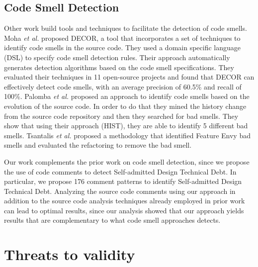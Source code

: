 \documentclass[conference]{IEEEtran}
\newcommand{\SADTD}{Self-admitted Design Technical Debt\xspace}
\begin{document}

\subsection{Code Smell Detection}

Other work build tools and techniques to facilitate the detection of code smells. Moha \textit{et al.} \cite{Moha2010TSE} proposed DECOR, a tool that incorporates a set of techniques to identify code smells in the source code. They used a domain specific language (DSL) to specify code smell detection rules. Their approach automatically generates detection algorithms based on the code smell specifications. They evaluated their techniques in 11 open-source projects and found that DECOR can effectively detect code smells, with an average precision of 60.5\% and recall of 100\%. Palomba \textit{et al.} \cite{Palomba2013} proposed an approach to identify code smells based on the evolution of the source code. In order to do that they mined the history change from the source code repository and then they searched for bad smells. They show that using their approach (HIST), they are able to identify 5 different bad smells. Tsantalis \textit{et al.} \cite{Tsantalis2009TSE} proposed a methodology that identified Feature Envy bad smells and evaluated the refactoring to remove the bad smell.

Our work complements the prior work on code smell detection, since we propose the use of code comments to detect \SADTD. In particular, we propose 176 comment patterns to identify \SADTD. Analyzing the source code comments using our approach in addition to the source code analysis techniques already employed in prior work can lead to optimal results, since our analysis showed that our approach yields results that are complementary to what code smell approaches detects.

\section{Threats to validity}
\label{sec:threats_to_validity}
\end{document}
